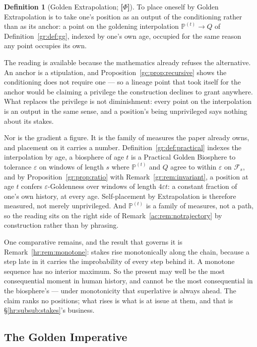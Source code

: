 \documentclass[11pt]{article}
\numberwithin{equation}{section}
\theoremstyle{plain}
\theoremstyle{definition}
\newtheorem{definition}[theorem]{Definition}
\theoremstyle{remark}
\newcommand{\PP}{\mathbb{P}}
\begin{document}
\begin{definition}[Golden Extrapolation; \textbf{[$\Phi$]}]\label{ac:def:extrapolation}
To place oneself by Golden Extrapolation is to take one's position as an output of the conditioning rather than as its anchor: a point on the goldening interpolation $\PP^{(t)} \to Q$ of Definition~\ref{gr:def:gg}, indexed by one's own age, occupied for the same reason any point occupies its own.
\end{definition}

The reading is available because the mathematics already refuses the alternative. An anchor is a stipulation, and Proposition~\ref{gc:prop:recursive} shows the conditioning does not require one --- so a lineage point that took itself for the anchor would be claiming a privilege the construction declines to grant anywhere. What replaces the privilege is not diminishment: every point on the interpolation is an output in the same sense, and a position's being unprivileged says nothing about its stakes.

Nor is the gradient a figure. It is the family of measures the paper already owns, and placement on it carries a number. Definition~\ref{gr:def:practical} indexes the interpolation by age, a biosphere of age $t$ is a Practical Golden Biosphere to tolerance $\varepsilon$ on windows of length $s$ where $\PP^{(t)}$ and $Q$ agree to within $\varepsilon$ on $\mathcal{F}_s$, and by Proposition~\ref{gr:prop:ratio} with Remark~\ref{gr:rem:invariant}, a position at age $t$ confers $\varepsilon$-Goldenness over windows of length $4\varepsilon t$: a constant fraction of one's own history, at every age. Self-placement by Extrapolation is therefore measured, not merely unprivileged. And $\PP^{(t)}$ is a family of measures, not a path, so the reading sits on the right side of Remark~\ref{ac:rem:notrajectory} by construction rather than by phrasing.

One comparative remains, and the result that governs it is Remark~\ref{hr:rem:monotone}: stakes rise monotonically along the chain, because a step late in it carries the improbability of every step behind it. A monotone sequence has no interior maximum. So the present may well be the most consequential moment in human history, and cannot be the most consequential in the biosphere's --- under monotonicity that superlative is always ahead. The claim ranks no positions; what rises is what is at issue at them, and that is \S\ref{hr:subsub:stakes}'s business.

\subsection{The Golden Imperative}\label{ac:sub:imperative}
\end{document}
